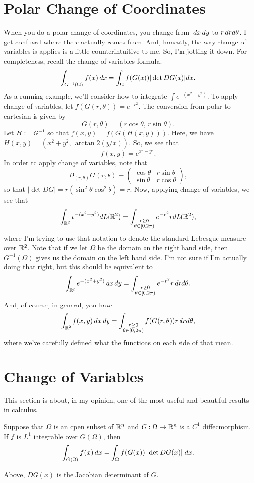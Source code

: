 \section{Polar Change of Coordinates}
When you do a polar change of coordinates, you change from $\, dx \, dy$ to $r\, dr d\theta$. I get confused where the $r$ actually comes from. And, honestly, the way change of variables is applies is a little counterintuitive to me. So, I'm jotting it down. 
For completeness, recall the change of variables formula. 
$$
\int_{G^{-1}(\Omega)} f(x)\, dx = \int_\Omega f(G(x))|\det DG(x)|dx.
$$
As a running example, we'll consider how to integrate $\int e^{-(x^2 + y^2)}$. To apply change of variables, let $f(G(r,\theta)) = e^{-r^2}$. The conversion from polar to cartesian is given by 
$$
G(r, \theta) = (r\cos \theta, ~r\sin \theta). 
$$
Let $H:= G^{-1}$ so that $f(x,y) = f(G(H(x, y)))$. Here, we have $H(x,y) = (x^2 + y^2, ~ \arctan{2}(y/x))$. So, we see that 
$$
f(x,y) = e^{x^2 + y^2}.
$$
In order to apply change of variables, note that 
$$
D_{(r,\theta)} G(r,\theta) = 
\begin{pmatrix}
\cos\theta & r\sin\theta\\
\sin\theta & r\cos\theta
\end{pmatrix},
$$
so that $|\det D G| = r(\sin^2\theta \cos^2\theta) = r$. Now, applying change of variables, we see that
$$
\int_{\mathbb{R}^2} e^{-(x^2 + y^2)} dL(\mathbb{R}^2) = \int_{\substack{r \geq 0\\ \theta \in [0, 2\pi)}} e^{-r^2} r dL(\mathbb{R}^2),
$$
where I'm trying to use that notation to denote the standard Lebesgue measure over $\mathbb{R}^2$. Note that if we let $\Omega$ be the domain on the right hand side, then $G^{-1}(\Omega)$ gives us the domain on the left hand side. I'm not sure if I'm actually doing that right, but this should be equivalent to
$$
\int_{\mathbb{R}^2} e^{-(x^2 + y^2)} \, dx \, dy = \int_{\substack{r \geq 0\\ \theta \in [0, 2\pi)}} e^{-r^2} r \, dr d\theta.
$$
And, of course, in general, you have
$$
\int_{\mathbb{R}^2} f(x,y) \, dx \, dy = \int_{\substack{r \geq 0\\ \theta \in [0, 2\pi)}} f(G(r,\theta)) r \, dr d\theta,
$$
where we've carefully defined what the functions on each side of that mean. 

\section{Change of Variables}
This section is about, in my opinion, one of the most useful and beautiful results in calculus. 
\begin{theorem} \label{thrm:CoV}
Suppose that $\Omega$ is an open subset of $\mathbb{R}^{n}$ and $G:\Omega\to \mathbb{R}^n$ is a $C^1$ diffeomorphism. If $f$ is $L^1$ integrable over $G(\Omega)$, then 
\begin{equation} \label{eq:CoV}
\int_{G(\Omega)} f(x) \, dx = \int_{\Omega} f(G(x)) \,\left| \det DG(x) \right| \, dx.
\end{equation}
\end{theorem}
Above, $DG(x)$ is the Jacobian determinant of $G$. 


